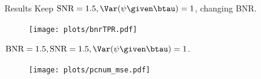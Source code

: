 \documentclass[final]{beamer}
\newlength{\sepwidth}
\newlength{\colwidth}
\newcommand{\separatorcolumn}{\begin{column}{\sepwidth}\end{column}}
\begin{document}
\begin{frame}[t]
\begin{columns}[t]
\begin{column}{\colwidth}
\begin{block}
      \end{block}
      
    \end{column}

    \separatorcolumn

    \begin{column}{\colwidth}
      
      \begin{block}{Results} 
        Keep $\text{SNR}=1.5, \Var(\psi\given \btau)=1$, changing BNR.  
        \begin{figure}
          \centering
          \texttt{[image: plots/bnrTPR.pdf]}
        \end{figure}

        $\text{BNR}=1.5, \text{SNR}=1.5, \Var(\psi\given \btau)=1$. 
        \begin{figure}
          \centering
          \texttt{[image: plots/pcnum\_mse.pdf]}
        \end{figure}

        \vspace{15mm}
        

\end{block}
\end{column}
\end{columns}
\end{frame}
\end{document}
